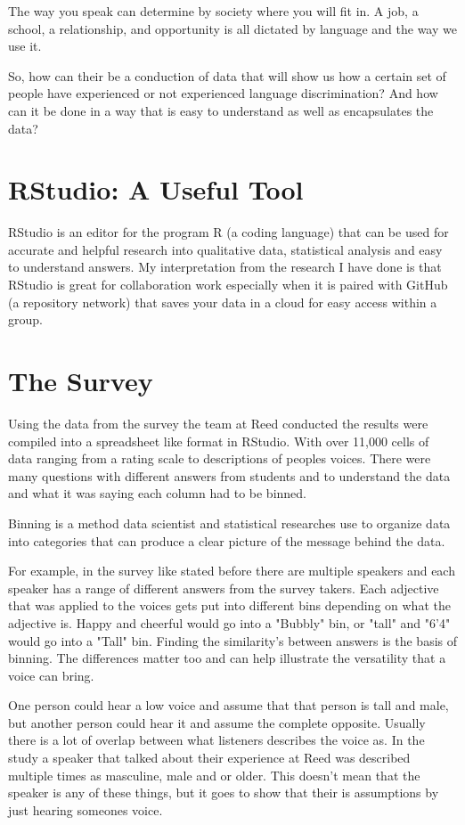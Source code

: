 \documentclass{scrartcl}
\begin{document}
The way you speak can determine by society where you will fit in. A job, a school, a relationship, and opportunity is all dictated by language and the way we use it.

So, how can their be a conduction of data that will show us how a certain set of people have experienced or not experienced language discrimination? And how can it be done in a way that is easy to understand as well as encapsulates the data? 

\section{RStudio: A Useful Tool}

RStudio is an editor for the program R (a coding language) that can be used for accurate and helpful research into qualitative data, statistical analysis and easy to understand answers. My interpretation from the research I have done is that RStudio is great for collaboration work especially when it is paired with GitHub (a repository network) that saves your data in a cloud for easy access within a group.

\section{The Survey}

Using the data from the survey the team at Reed conducted the results were compiled into a spreadsheet like format in RStudio. With over 11,000 cells of data ranging from a rating scale to descriptions of peoples voices. There were many questions with different answers from students and to understand the data and what it was saying each column had to be binned. 

Binning is a method data scientist and statistical researches use to organize data into categories that can produce a clear picture of the message behind the data. 

For example, in the survey like stated before there are multiple speakers and each speaker has a range of different answers from the survey takers. Each adjective that was applied to the voices gets put into different bins depending on what the adjective is. Happy and cheerful would go into a "Bubbly" bin, or "tall" and "6'4" would go into a "Tall" bin. Finding the similarity's between answers is the basis of binning. The differences matter too and can help illustrate the versatility that a voice can bring. 

One person could hear a low voice and assume that that person is tall and male, but another person could hear it and assume the complete opposite. Usually there is a lot of overlap between what listeners describes the voice as. In the study a speaker that talked about their experience at Reed was described multiple times as masculine, male and or older. This doesn't mean that the speaker is any of these things, but it goes to show that their is assumptions by just hearing someones voice. 
\end{document}
